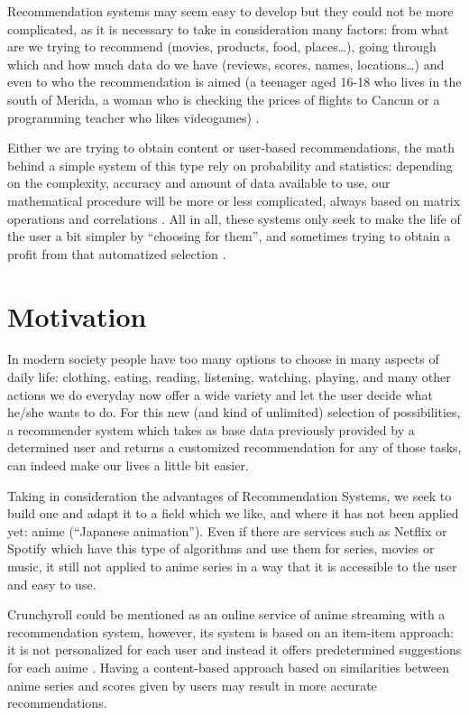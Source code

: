 \documentclass[conference]{IEEEtran}
\begin{document}
Recommendation systems may seem easy to develop but they could not be more complicated, as it is necessary to take in consideration many factors: from what are we trying to recommend (movies, products, food, places…), going through which and how much data do we have (reviews, scores, names, locations…) and even to who the recommendation is aimed (a teenager aged 16-18 who lives in the south of Merida, a woman who is checking the prices of flights to Cancun or a programming teacher who likes videogames) \cite{b3}.

Either we are trying to obtain content or user-based recommendations, the math behind a simple system of this type rely on probability and statistics: depending on the complexity, accuracy and amount of data available to use, our mathematical procedure will be more or less complicated, always based on matrix operations and correlations \cite{b4}. All in all, these systems only seek to make the life of the user a bit simpler by “choosing for them”, and sometimes trying to obtain a profit from that automatized selection \cite{b5}.

\section{Motivation}
In modern society people have too many options to choose in many aspects of daily life: clothing, eating, reading, listening, watching, playing, and many other actions we do everyday now offer a wide variety and let the user decide what he/she wants to do. For this new (and kind of unlimited) selection of possibilities, a recommender system which takes as base data previously provided by a determined user and returns a customized recommendation for any of those tasks, can indeed make our lives a little bit easier.

Taking in consideration the advantages of Recommendation Systems, we seek to build one and adapt it to a field which we like, and where it has not been applied yet: anime (“Japanese animation”). Even if there are services such as Netflix or Spotify which have this type of algorithms and use them for series, movies or music, it still not applied to anime series in a way that it is accessible to the user and easy to use.

Crunchyroll could be mentioned as an online service of anime streaming with a recommendation system, however, its system is based on an item-item approach: it is not personalized for each user and instead it offers predetermined suggestions for each anime \cite{b6}. Having a content-based approach based on similarities between anime series and scores given by users may result in more accurate recommendations.
\end{document}
